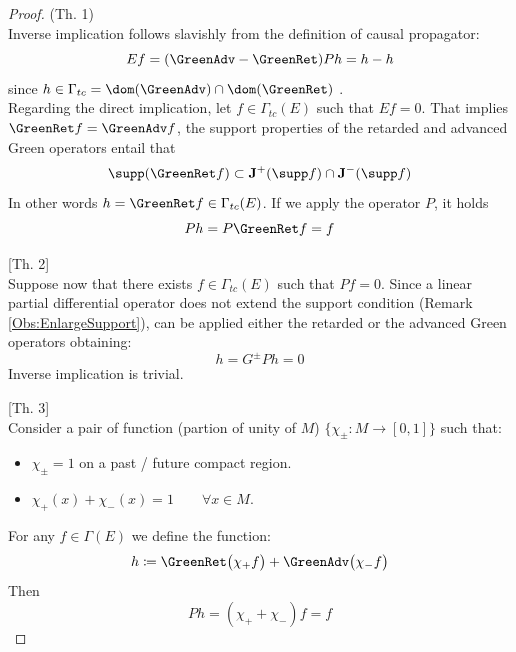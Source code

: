 \documentclass[Main]{subfiles}
\begin{document}
			\begin{proof}
			(Th. 1)\\
			Inverse implication follows slavishly from the definition of causal propagator:
			\begin{displaymath}
				E f= (\GreenAdv - \GreenRet) P h = h -h
			\end{displaymath}
			since $h\in \Gamma_{tc} = \dom(\GreenAdv) \cap \dom(\GreenRet)$ .
			\\
			Regarding the direct implication, let $f \in \Gamma_{tc}(E)$ such that $E f = 0$.
			That implies $\GreenRet f = \GreenAdv f $, the support properties of the retarded and advanced Green operators entail that
			\begin{displaymath}
				\supp (\GreenRet f ) \subset \mathbf{J}^+ (\supp f) \cap \mathbf{J}^- (\supp f)
			\end{displaymath}
			 In other words $h = \GreenRet f \in \Gamma_{tc}(E)$. 
			 If we apply the operator $P$, it holds 
			 \begin{displaymath}
			 	P h = P \GreenRet f = f
			 \end{displaymath}
			
			[Th. 2]\\
			Suppose now that there exists $f \in \Gamma_{tc}(E)$ such that $Pf = 0$. Since a linear partial differential operator does not extend the support condition (Remark \ref{Obs:EnlargeSupport}), can be applied either
the retarded or the advanced Green operators obtaining:
			\begin{displaymath}
				h = G^\pm P h = 0
			\end{displaymath}
			Inverse implication is trivial.
			
			[Th. 3]\\
			Consider a pair of function (partion of unity of $M$) $\{\chi_\pm: M \rightarrow [0,1] \}$ such that:
			\begin{itemize}
				\item $\chi_\pm = 1$ on a past / future compact region.
				\item $\chi_+(x) + \chi_-(x) = 1 \qquad \forall x\in M$.
			\end{itemize}
			For any $f \in 	\Gamma(E)$ we define the function:
			\begin{displaymath}
				h \coloneqq \GreenRet \big( \chi_+ f \big) + \GreenAdv \big( \chi_- f \big)
			\end{displaymath}
			Then
			\begin{displaymath}
				P h = (\chi_+ + \chi_-)f = f
			\end{displaymath}
			\end{proof}
			
\end{document}
